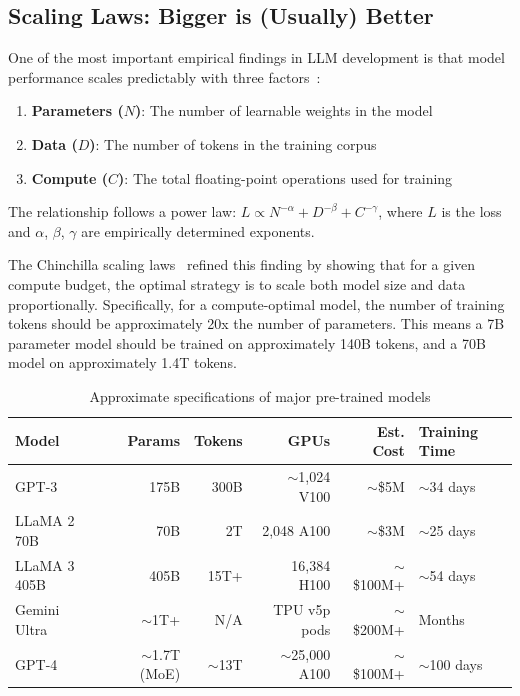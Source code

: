 \subsection{Scaling Laws: Bigger is (Usually) Better}

One of the most important empirical findings in LLM development is that model performance scales predictably with three factors~\cite{kaplan2020scaling}:

\begin{enumerate}[leftmargin=*]
    \item \textbf{Parameters ($N$)}: The number of learnable weights in the model
    \item \textbf{Data ($D$)}: The number of tokens in the training corpus
    \item \textbf{Compute ($C$)}: The total floating-point operations used for training
\end{enumerate}

The relationship follows a power law: $L \propto N^{-\alpha} + D^{-\beta} + C^{-\gamma}$, where $L$ is the loss and $\alpha$, $\beta$, $\gamma$ are empirically determined exponents.

The Chinchilla scaling laws~\cite{hoffmann2022chinchilla} refined this finding by showing that for a given compute budget, the optimal strategy is to scale both model size and data proportionally. Specifically, for a compute-optimal model, the number of training tokens should be approximately 20x the number of parameters. This means a 7B parameter model should be trained on approximately 140B tokens, and a 70B model on approximately 1.4T tokens.

\begin{table}[htbp]
\centering
\caption{Approximate specifications of major pre-trained models}
\label{tab:model-specs}
\begin{tabularx}{\textwidth}{lrrrrX}
\toprule
\textbf{Model} & \textbf{Params} & \textbf{Tokens} & \textbf{GPUs} & \textbf{Est. Cost} & \textbf{Training Time} \\
\midrule
GPT-3        & 175B   & 300B    & $\sim$1,024 V100 & $\sim$\$5M     & $\sim$34 days \\
LLaMA 2 70B  & 70B    & 2T      & 2,048 A100  & $\sim$\$3M     & $\sim$25 days \\
LLaMA 3 405B & 405B   & 15T+    & 16,384 H100 & $\sim$\$100M+  & $\sim$54 days \\
Gemini Ultra  & $\sim$1T+ & N/A  & TPU v5p pods & $\sim$\$200M+  & Months \\
GPT-4        & $\sim$1.7T (MoE) & $\sim$13T & $\sim$25,000 A100 & $\sim$\$100M+ & $\sim$100 days \\
\bottomrule
\end{tabularx}
\end{table}

